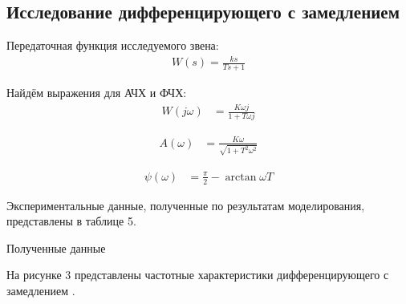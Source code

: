 \documentclass[a4paper, 12pt]{article}
\begin{document}
\newpage
\begin{center}
	\section{Исследование дифференцирующего с замедлением }
\end{center}

\par 
Передаточная функция исследуемого звена:
\begin{align}
	W(s)=\frac{ks}{Ts + 1}
\end{align}
\par 
Найдём выражения для АЧХ и ФЧХ:
\begin{align}
 W(j\omega) & = \frac{K\omega j}{1 + T\omega j}
\end{align}

\begin{align}
 A(\omega) & = \frac{K\omega}{\sqrt{1 + T^2\omega^2}}
\end{align}

\begin{align}
\psi(\omega) & = \frac{\pi}{2}-\arctan{\omega T}
\end{align}

\par 
Экспериментальные данные, полученные по результатам моделирования, представлены в таблице 5.
\newpage
\begin{table}[h!]
    \centering
    \begin{threeparttable}
        \caption{Полученные данные} \label{tab:perflogcross}
         
    \end{threeparttable}
\end{table}

\newpage
\par 
На рисунке 3 представлены частотные характеристики дифференцирующего с замедлением .
\end{document}

